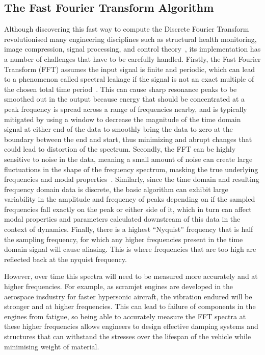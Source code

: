 \documentclass[12pt]{article}
\begin{document}
    \subsection{The Fast Fourier Transform Algorithm}
    Although discovering this fast way to compute the Discrete Fourier Transform revolutionised many engineering disciplines such as structural health monitoring, image compression, signal processing, and control theory~\cite{Byjus2023}, its implementation has a number of challenges that have to be carefully handled.
    Firstly, the Fast Fourier Transform (FFT) assumes the input signal is finite and periodic, which can lead to a phenomenon called spectral leakage if the signal is not an exact multiple of the chosen total time period~\cite{MathStackExchange2023}.
    This can cause sharp resonance peaks to be smoothed out in the output because energy that should be concentrated at a peak frequency is spread across a range of frequencies nearby, and is typically mitigated by using a window to decrease the magnitude of the time domain signal at either end of the data to smoothly bring the data to zero at the boundary between the end and start, thus minimizing and abrupt changes that could lead to distortion of the spectrum.
    Secondly, the FFT can be highly sensitive to noise in the data, meaning a small amount of noise can create large fluctuations in the shape of the frequency spectrum, masking the true underlying frequencies and modal properties~\cite{MathStackExchange2023}.
    Similarly, since the time domain and resulting frequency domain data is discrete, the basic algorithm can exhibit large variability in the amplitude and frequency of peaks depending on if the sampled frequencies fall exactly on the peak or either side of it, which in turn can affect modal properties and parameters calculated downstream of this data in the context of dynamics.
    Finally, there is a highest ``Nyquist'' frequency that is half the sampling frequency, for which any higher frequencies present in the time domain signal will cause aliasing.
    This is where frequencies that are too high are reflected back at the nyquist frequency.



    However, over time this spectra will need to be measured more accurately and at higher frequencies.
    For example, as scramjet engines are developed in the aerospace insdustry for faster hypersonic aircraft, the vibration endured will be stronger and at higher frequencies.
    This can lead to failure of components in the engines from fatigue, so being able to accurately measure the FFT spectra at these higher frequencies allows engineers to design effective damping systems and structures that can withstand the stresses over the lifespan of the vehicle while minimising weight of material.
\end{document}
